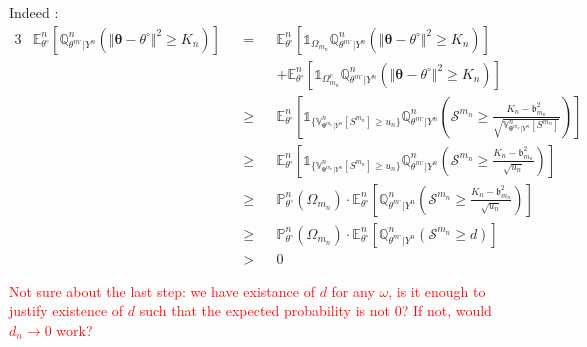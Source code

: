 Indeed :
\begin{alignat*}{3}
&\mathds{E}_{\theta^{\circ}}^{n}\left[\mathds{Q}_{\theta^{m^{\circ}}\vert Y^{n}}^{n}\left(\Vert \boldsymbol{\theta} - \theta^{\circ} \Vert^{2} \geq K_{n}\right)\right] && = &&\mathds{E}_{\theta^{\circ}}^{n}\left[\mathds{1}_{\Omega_{m_{n}}}\mathds{Q}_{\theta^{m^{\circ}}\vert Y^{n}}^{n}\left(\Vert \boldsymbol{\theta} - \theta^{\circ} \Vert^{2} \geq K_{n}\right)\right]\\
& && && + \mathds{E}_{\theta^{\circ}}^{n}\left[\mathds{1}_{\Omega_{m_{n}}^{c}}\mathds{Q}_{\theta^{m^{\circ}}\vert Y^{n}}^{n}\left(\Vert \boldsymbol{\theta} - \theta^{\circ} \Vert^{2} \geq K_{n}\right)\right]\\
& &&\geq &&\mathds{E}_{\theta^{\circ}}^{n}\left[\mathds{1}_{\{\mathds{V}_{\boldsymbol{\theta}^{m_{n}} \vert Y^{n}}^{n}\left[S^{m_{n}}\right] \geq u_{n}\}}\mathds{Q}_{\theta^{m^{\circ}}\vert Y^{n}}^{n}\left(\mathcal{S}^{m_{n}} \geq \frac{K_{n} - \mathfrak{b}_{m_{n}}^{2}}{\sqrt{\mathds{V}_{\boldsymbol{\theta}^{m_{n}} \vert Y^{n}}^{n}\left[S^{m_{n}}\right]}}\right)\right]\\
& &&\geq &&\mathds{E}_{\theta^{\circ}}^{n}\left[\mathds{1}_{\{\mathds{V}_{\boldsymbol{\theta}^{m_{n}} \vert Y^{n}}^{n}\left[S^{m_{n}}\right] \geq u_{n}\}}\mathds{Q}_{\theta^{m^{\circ}}\vert Y^{n}}^{n}\left(\mathcal{S}^{m_{n}} \geq \frac{K_{n} - \mathfrak{b}_{m_{n}}^{2}}{\sqrt{u_{n}}}\right)\right]\\
& &&\geq &&\mathds{P}_{\theta^{\circ}}^{n}(\Omega_{m_{n}})\cdot\mathds{E}_{\theta^{\circ}}^{n}\left[\mathds{Q}_{\theta^{m^{\circ}}\vert Y^{n}}^{n}\left(\mathcal{S}^{m_{n}} \geq \frac{K_{n} - \mathfrak{b}_{m_{n}}^{2}}{\sqrt{u_{n}}}\right)\right]\\
& &&\geq &&\mathds{P}_{\theta^{\circ}}^{n}(\Omega_{m_{n}})\cdot\mathds{E}_{\theta^{\circ}}^{n}\left[\mathds{Q}_{\theta^{m^{\circ}}\vert Y^{n}}^{n}\left(\mathcal{S}^{m_{n}} \geq d \right)\right]\\
& && > && 0
\end{alignat*}

\textcolor{red}{ Not sure about the last step: we have existance of $d$ for any $\omega$, is it enough to justify existence of $d$ such that the expected probability is not $0$? If not, would $d_{n} \rightarrow 0$ work?}





